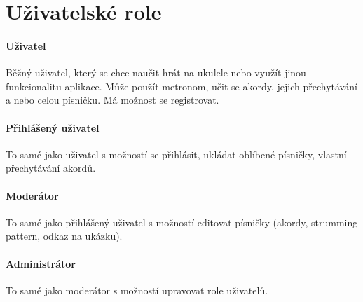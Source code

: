 \section{Uživatelské role}
\label{sc:user_roles}

\noindent \begin{minipage}{\textwidth}
    \paragraph{Uživatel}
    \begin{smallindent}{}
        Běžný uživatel, který se chce naučit hrát na ukulele nebo využít jinou funkcionalitu aplikace. Může použít metronom, učit se akordy, jejich přechytávání a nebo celou písničku.
        Má možnost se registrovat.
    \end{smallindent}
\end{minipage}


\noindent \begin{minipage}{\textwidth}
    \paragraph{Přihlášený uživatel}
    \begin{smallindent}{}
        To samé jako uživatel s možností se přihlásit, ukládat oblíbené písničky, vlastní přechytávání akordů. 
    \end{smallindent}
\end{minipage}

\noindent \begin{minipage}{\textwidth}
    \paragraph{Moderátor}
    \begin{smallindent}{}
        To samé jako přihlášený uživatel s možností editovat písničky (akordy, strumming pattern, odkaz na ukázku).
    \end{smallindent}
\end{minipage}

\noindent \begin{minipage}{\textwidth}
    \paragraph{Administrátor}
    \begin{smallindent}{}
        To samé jako moderátor s možností upravovat role uživatelů.
    \end{smallindent}
\end{minipage}